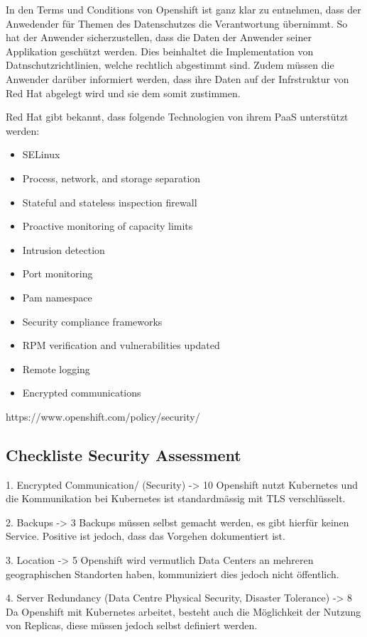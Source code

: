 \documentclass[12pt,a4paper]{article}
\begin{document}
In den Terms und Conditions von Openshift ist ganz klar zu entnehmen, dass der Anwedender für Themen des Datenschutzes die Verantwortung übernimmt.
So hat der Anwender sicherzustellen, dass die Daten der Anwender seiner Applikation geschützt werden. Dies beinhaltet die Implementation von
Datnschutzrichtlinien, welche rechtlich abgestimmt sind. Zudem müssen die Anwender darüber informiert werden, dass ihre Daten auf der Infrstruktur
von Red Hat abgelegt wird und sie dem somit zustimmen.

Red Hat gibt bekannt, dass folgende Technologien von ihrem PaaS unterstützt werden:

\begin{itemize}
    \item SELinux
    \item Process, network, and storage separation
    \item Stateful and stateless inspection firewall
    \item Proactive monitoring of capacity limits
    \item Intrusion detection
    \item Port monitoring
    \item Pam namespace
    \item Security compliance frameworks
    \item RPM verification and vulnerabilities updated
    \item Remote logging
    \item Encrypted communications
\end{itemize}
https://www.openshift.com/policy/security/

\subsection{Checkliste Security Assessment}
1. Encrypted Communication/ (Security) -> 10
Openshift nutzt Kubernetes und die Kommunikation bei Kubernetes ist standardmässig mit TLS verschlüsselt.


2. Backups -> 3
Backups müssen selbst gemacht werden, es gibt hierfür keinen Service. Positive ist jedoch, dass das Vorgehen dokumentiert ist.


3. Location -> 5
Openshift wird vermutlich Data Centers an mehreren geographischen Standorten haben, kommuniziert dies jedoch nicht öffentlich.


4. Server Redundancy (Data Centre Physical Security, Disaster Tolerance) -> 8
Da Openshift mit Kubernetes arbeitet, besteht auch die Möglichkeit der Nutzung von Replicas, diese müssen jedoch selbst definiert werden.
\end{document}
